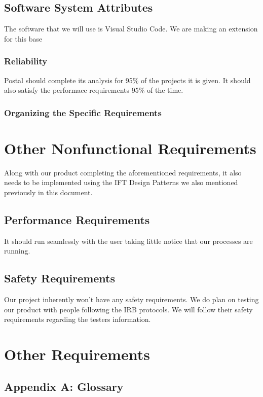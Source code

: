 \documentclass[letterpaper,10pt,titlepage,draftclsnofoot,onecolumn] {IEEEtran}
\begin{document}
\subsection{Software System Attributes}
The software that we will use is Visual Studio Code. We are making an extension for this base

\subsubsection{Reliability}
Postal should complete its analysis for 95\% of the projects it is given. It should also satisfy the performace requirements 95\% of the time.  

\subsubsection{Organizing the Specific Requirements}

\section{Other Nonfunctional Requirements}
Along with our product completing the aforementioned requirements, it also needs to be implemented using the IFT Design Patterns we also mentioned previously in this document.

\subsection{Performance Requirements}
It should run seamlessly with the user taking little notice that our processes are running. 

\subsection{Safety Requirements}
Our project inherently won't have any safety requirements. 
We do plan on testing our product with people following the IRB protocols.
We will follow their safety requirements regarding the testers information.

\section{Other Requirements}

\subsection{Appendix A: Glossary}
\end{document}
